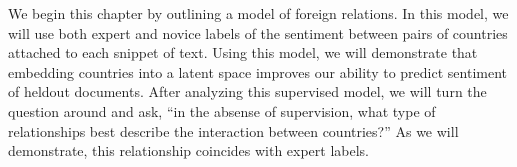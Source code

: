 We begin this chapter by outlining a model of foreign relations.  In
this model, we will use both expert and novice labels of the sentiment
between pairs of countries attached to each snippet of text.  Using
this model, we will demonstrate that embedding countries into a latent
space improves our ability to predict sentiment of heldout documents.
After analyzing this supervised model, we will turn the question
around and ask, ``in the absense of supervision, what type of
relationships best describe the interaction between countries?''  As
we will demonstrate, this relationship coincides with expert labels.


